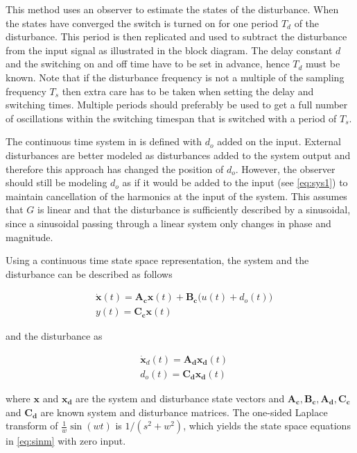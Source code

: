 This method uses an observer to estimate the states of the disturbance. When the states have converged the switch is turned on for one period $T_d$ of the disturbance. This period is then replicated and used to subtract the disturbance from the input signal as illustrated in the block diagram. The delay constant $d$ and the switching on and off time have to be set in advance, hence $T_d$ must be known. Note that if the disturbance frequency is not a multiple of the sampling frequency $T_s$ then extra care has to be taken when setting the delay and switching times. Multiple periods should preferably be used to get a full number of oscillations within the switching timespan that is switched with a period of $T_s$.

The continuous time system in \citep{fujimoto2004repetitive} is defined with $d_o$ added on the input. External disturbances are better modeled as disturbances added to the system output and therefore this approach has changed the position of $d_o$. However, the observer should still be modeling $d_o$ as if it would be added to the input (see \eqref{eq:sys1}) to maintain cancellation of the harmonics at the input of the system. This assumes that $G$ is linear and that the disturbance is sufficiently described by a sinusoidal, since a sinusoidal passing through a linear system only changes in phase and magnitude.

Using a continuous time state space representation, the system and the disturbance can be described as follows

\begin{subequations}
  \label{eq:sys12}
  \begin{alignat}{2}
    \label{eq:sys1}
    & \mathbf{\dot{x}}(t) = \mathbf{A_cx}(t) + \mathbf{B_c}\big(u(t) + d_o(t)\big) \\
    \label{eq:sys2}
    & y(t) = \mathbf{C_cx}(t)
  \end{alignat}
\end{subequations}

and the disturbance as

\begin{subequations}
  \label{eq:dist12}
  \begin{alignat}{2}
    \label{eq:dist1}
    & \mathbf{\dot{x}}_d(t) = \mathbf{A_dx_d}(t) \\
    \label{eq:dist2}
    & d_o(t) = \mathbf{C_dx_d}(t)
  \end{alignat}
\end{subequations}

where $\mathbf{x}$ and $\mathbf{x_d}$ are the system and disturbance state vectors and $\mathbf{A_c, B_c, A_d, C_c}$ and $\mathbf{C_d}$ are known system and disturbance matrices. The one-sided Laplace transform of $\frac{1}{w}\sin(wt)$ is $1/(s^2 + w^2)$, which yields the state space equations in \eqref{eq:sinm} with zero input.

